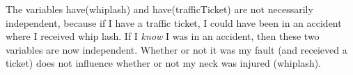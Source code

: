 \documentclass[a4paper,12pt]{article}
\newenvironment{ind}[1]%
{\begin{list}{}%
         {\setlength{\leftmargin}{#1}}%
       \item[]%
}
{\end{list}}
\begin{document}
\begin{enumerate}[]
    \begin{ind}{0.5in}
      The variables have(whiplash) and have(trafficTicket) are not
      necessarily independent, because if I have a traffic ticket, I
      could have been in an accident where I received whip lash. If I
      \emph{know} I was in an accident, then these two variables are
      now independent. Whether or not it was my fault (and receieved a
      ticket) does not influence whether or not my neck was injured
      (whiplash).
    \end{ind}

\end{enumerate}
\end{document}
